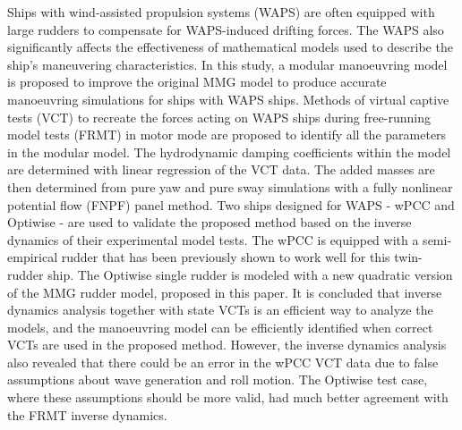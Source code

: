Ships with wind-assisted propulsion systems (WAPS) are often equipped with large rudders to compensate for WAPS-induced drifting forces. The WAPS also significantly affects the effectiveness of mathematical models used to describe the ship's maneuvering characteristics. In this study, a modular manoeuvring model is proposed to improve the original MMG model to produce accurate manoeuvring simulations for ships with WAPS ships. 
Methods of virtual captive tests (VCT) to recreate the forces acting on WAPS ships during free-running model tests (FRMT) in motor mode are proposed to identify all the parameters in the modular model. 
The hydrodynamic damping coefficients within the model are determined with linear regression of the VCT data. The added masses are then determined from pure yaw and pure sway simulations with a fully nonlinear potential flow (FNPF) panel method.
Two ships designed for WAPS - wPCC and Optiwise - are used to validate the proposed method based on the inverse dynamics of their experimental model tests. The wPCC is equipped with a semi-empirical rudder that has been previously shown to work well for this twin-rudder ship. The Optiwise single rudder is modeled with a new quadratic version of the MMG rudder model, proposed in this paper. 
It is concluded that inverse dynamics analysis together with state VCTs is an efficient way to analyze the models, and the manoeuvring model can be efficiently identified when correct VCTs are used in the proposed method. However, the inverse dynamics analysis also revealed that there could be an error in the wPCC VCT data due to false assumptions about wave generation and roll motion. The Optiwise test case, where these assumptions should be more valid, had much better agreement with the FRMT inverse dynamics. 


%    

